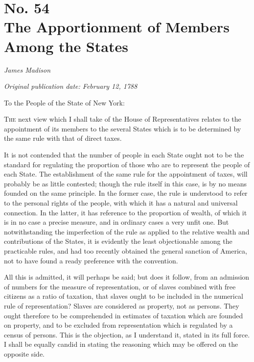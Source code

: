 \chapter[No. 54: The Apportionment of Members Among the States]{No. 54\\ {\small The Apportionment of Members Among the States}}

\textit{James Madison}

\textit{Original publication date: February 12, 1788}
\vspace{1cm}

To the People of the State of New York:
\vspace{.4cm}

\textsc{The} next view which I shall take of the House of Representatives relates to the appointment of its members to the several States which is to be determined by the same rule with that of direct taxes.

It is not contended that the number of people in each State ought not to be the standard for regulating the proportion of those who are to represent the people of each State. 
The establishment of the same rule for the appointment of taxes, will probably be as little contested; though the rule itself in this case, is by no means founded on the same principle. 
In the former case, the rule is understood to refer to the personal rights of the people, with which it has a natural and universal connection. 
In the latter, it has reference to the proportion of wealth, of which it is in no case a precise measure, and in ordinary cases a very unfit one. 
But notwithstanding the imperfection of the rule as applied to the relative wealth and contributions of the States, it is evidently the least objectionable among the practicable rules, and had too recently obtained the general sanction of America, not to have found a ready preference with the convention.

All this is admitted, it will perhaps be said; but does it follow, from an admission of numbers for the measure of representation, or of slaves combined with free citizens as a ratio of taxation, that slaves ought to be included in the numerical rule of representation? 
Slaves are considered as property, not as persons. 
They ought therefore to be comprehended in estimates of taxation which are founded on property, and to be excluded from representation which is regulated by a census of persons. 
This is the objection, as I understand it, stated in its full force. 
I shall be equally candid in stating the reasoning which may be offered on the opposite side.

